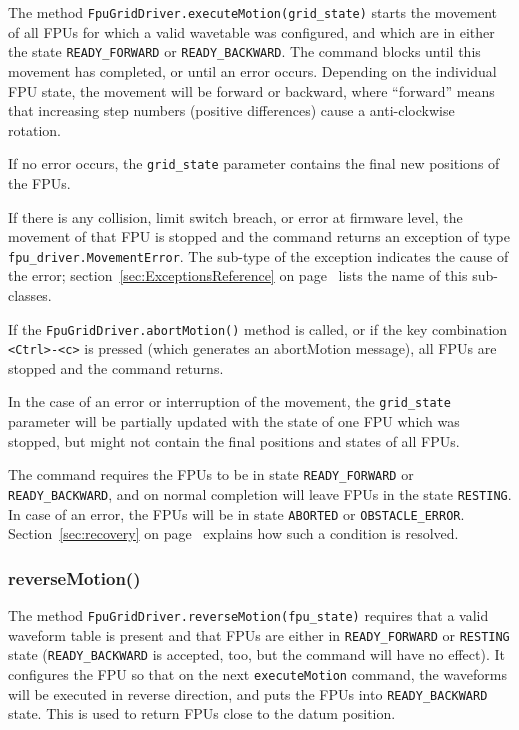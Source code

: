 \documentclass[11pt,a4paper]{report}
\begin{document}
The method \texttt{FpuGridDriver.executeMotion(grid\_state)} starts
the movement of all FPUs for which a valid wavetable was configured,
and which are in either the state \texttt{READY\_FORWARD} or
\texttt{READY\_BACKWARD}. The command blocks until this movement has
completed, or until an error occurs. Depending on the individual FPU
state, the movement will be forward or backward, where ``forward''
means that increasing step numbers (positive differences)
cause a anti-clockwise rotation.


If no error occurs, the \texttt{grid\_state} parameter contains the
final new positions of the FPUs.

If there is any collision, limit switch breach, or error at firmware
level, the movement of that FPU is stopped and the command returns an
exception of type \texttt{fpu\_driver.MovementError}. The sub-type of
the exception indicates the cause of the error;
section~\ref{sec:ExceptionsReference} on
page~\pageref{sec:ExceptionsReference} lists the name of this
sub-classes.

If the \texttt{FpuGridDriver.abortMotion()} method is called, or if
the key combination \texttt{<Ctrl>-<c>} is pressed (which generates an
abortMotion message), all FPUs are stopped and the command returns.

In the case of an error or interruption of the movement, the
\texttt{grid\_state} parameter will be partially updated with the
state of one FPU which was stopped, but might not contain the final
positions and states of all FPUs.

The command requires the FPUs to be in state \texttt{READY\_FORWARD}
or \texttt{READY\_BACKWARD}, and on normal completion will leave FPUs
in the state \texttt{RESTING}. In case of an error, the FPUs will be
in state \texttt{ABORTED} or \texttt{OBSTACLE\_ERROR}.
Section~\ref{sec:recovery} on page~\pageref{sec:recovery} explains how
such a condition is resolved.



\subsubsection{reverseMotion()}

The method \texttt{FpuGridDriver.reverseMotion(fpu\_state)} requires
that a valid waveform table is present and that FPUs are either in
\texttt{READY\_FORWARD} or \texttt{RESTING} state
(\texttt{READY\_BACKWARD} is accepted, too, but the command will have
no effect). It configures the FPU so that on the next
\texttt{executeMotion} command, the waveforms will be executed in
reverse direction, and puts the FPUs into \texttt{READY\_BACKWARD}
state. This is used to return FPUs close to the datum position.
\end{document}
